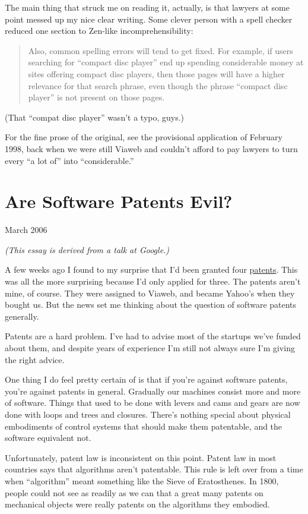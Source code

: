 \documentclass[12pt]{book}
\begin{document}
The main thing that struck me on reading it, actually, is that lawyers
at some point messed up my nice clear writing. Some clever person with a
spell checker reduced one section to Zen-like incomprehensibility:

\begin{quote}
Also, common spelling errors will tend to get fixed. For example, if
users searching for ``compact disc player'' end up spending considerable
money at sites offering compact disc players, then those pages will have
a higher relevance for that search phrase, even though the phrase
``compact disc player'' is not present on those pages.
\end{quote}

(That ``compat disc player'' wasn't a typo, guys.)

For the fine prose of the original, see the provisional application of
February 1998, back when we were still Viaweb and couldn't afford to pay
lawyers to turn every ``a lot of'' into ``considerable.''
\chapter{Are Software Patents Evil?}

March 2006

\emph{(This essay is derived from a talk at Google.)}

A few weeks ago I found to my surprise that I'd been granted four
\href{http://paulgraham.infogami.com/blog/morepatents}{patents}. This
was all the more surprising because I'd only applied for three. The
patents aren't mine, of course. They were assigned to Viaweb, and became
Yahoo's when they bought us. But the news set me thinking about the
question of software patents generally.

Patents are a hard problem. I've had to advise most of the startups
we've funded about them, and despite years of experience I'm still not
always sure I'm giving the right advice.

One thing I do feel pretty certain of is that if you're against software
patents, you're against patents in general. Gradually our machines
consist more and more of software. Things that used to be done with
levers and cams and gears are now done with loops and trees and
closures. There's nothing special about physical embodiments of control
systems that should make them patentable, and the software equivalent
not.

Unfortunately, patent law is inconsistent on this point. Patent law in
most countries says that algorithms aren't patentable. This rule is left
over from a time when ``algorithm'' meant something like the Sieve of
Eratosthenes. In 1800, people could not see as readily as we can that a
great many patents on mechanical objects were really patents on the
algorithms they embodied.
\end{document}
